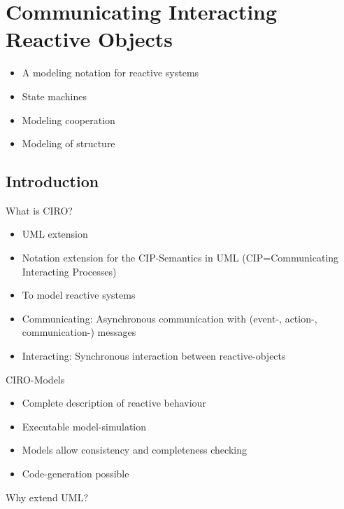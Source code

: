 \section{Communicating Interacting Reactive Objects}
\begin{itemize}
    \item A modeling notation for reactive systems
    \item State machines
    \item Modeling cooperation
    \item Modeling of structure
\end{itemize}

\subsection{Introduction}
What is CIRO?
\begin{itemize}
    \item UML extension
    \item Notation extension for the CIP-Semantics in UML (CIP=Communicating Interacting Processes)
    \item To model reactive systems
    \item Communicating: Asynchronous communication with (event-, action-, communication-) messages
    \item Interacting: Synchronous interaction between reactive-objects
\end{itemize}
CIRO-Models
\begin{itemize}
    \item Complete description of reactive behaviour
    \item Executable model-simulation
    \item Models allow consistency and completeness checking
    \item Code-generation possible
\end{itemize}
Why extend UML?
